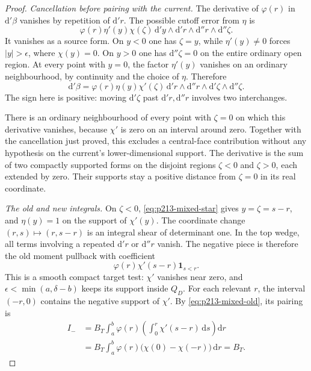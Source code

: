 \begin{proof}
\emph{Cancellation before pairing with the current.}
The derivative of \(\varphi(r)\) in
\(\mathrm d'\beta\) vanishes by repetition of
\(\mathrm d'r\). The possible cutoff error from \(\eta\)
is
\[
 \varphi(r)\eta'(y)\chi(\zeta)\,
 \mathrm d'y\wedge\mathrm d'r\wedge
                         \mathrm d''r\wedge\mathrm d''\zeta .
\]
It vanishes as a source form. On \(y<0\) one has
\(\zeta=y\), while \(\eta'(y)\ne0\) forces
\(|y|>\epsilon\), where \(\chi(y)=0\).
On \(y>0\) one has \(\mathrm d''\zeta=0\) on
the entire ordinary open region. At every point with
\(y=0\), the factor \(\eta'(y)\) vanishes on an
ordinary neighbourhood, by continuity and the choice
of \(\eta\). Therefore
\[
 \mathrm d'\beta
   =\varphi(r)\eta(y)\chi'(\zeta)\,
       \mathrm d'r\wedge\mathrm d''r\wedge
                       \mathrm d'\zeta\wedge\mathrm d''\zeta.
\]
The sign here is positive: moving \(\mathrm d'\zeta\)
past \(\mathrm d'r,\mathrm d''r\) involves two
interchanges.

There is an ordinary neighbourhood of every point
with \(\zeta=0\) on which this derivative vanishes,
because \(\chi'\) is zero on an interval around zero.
Together with the cancellation just proved, this
excludes a central-face contribution without any
hypothesis on the current's lower-dimensional support.
The derivative is the sum of two compactly supported
forms on the disjoint regions \(\zeta<0\) and
\(\zeta>0\), each extended by zero. Their supports
stay a positive distance from \(\zeta=0\) in its
real coordinate.

\emph{The old and new integrals.}
On \(\zeta<0\), \eqref{eq:p213-mixed-star} gives
\(y=\zeta=s-r\), and \(\eta(y)=1\) on the support
of \(\chi'(y)\). The coordinate change
\((r,s)\mapsto(r,s-r)\) is an integral shear of
determinant one. In the top wedge, all terms involving
a repeated \(\mathrm d'r\) or \(\mathrm d''r\)
vanish. The negative piece is therefore the old
moment pullback with coefficient
\[
       \varphi(r)\chi'(s-r)\mathbf 1_{s<r}.
\]
This is a smooth compact target test: \(\chi'\)
vanishes near zero, and \(\epsilon<\min(a,\delta-b)\)
keeps its support inside \(Q_D\). For each relevant
\(r\), the interval \((-r,0)\) contains the negative
support of \(\chi'\). By
\eqref{eq:p213-mixed-old}, its pairing is
\[
 \begin{split}
 I_-&=B_T\int_a^b\varphi(r)
       \left(\int_0^r\chi'(s-r)\,\mathrm ds\right)\mathrm dr\\
    &=B_T\int_a^b\varphi(r)
               \bigl(\chi(0)-\chi(-r)\bigr)\,\mathrm dr
      =B_T .
 \end{split}
\]


\end{proof}
